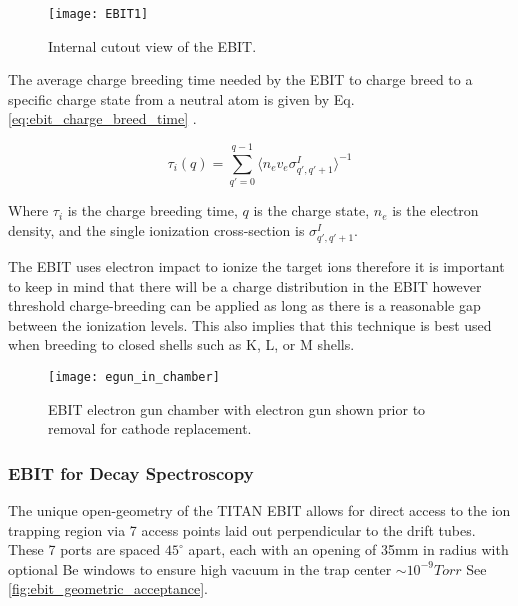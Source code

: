\documentclass[jon_ringuette_thesis_proposal.tex]{subfiles}
\begin{document}
    \begin{figure}[H]
        \begin{center}
            \texttt{[image: EBIT1]}
        \end{center}
        \caption{\small Internal cutout view of the EBIT. \cite{Leach}}
        \label{fig:ebit_schematic_1}
    \end{figure}


    The average charge breeding time needed by the EBIT to charge breed to a specific charge state from a neutral atom is given by Eq. \ref{eq:ebit_charge_breed_time} \cite{SPRINGER_1997}.

    \begin{equation}
        \tau_i(q) = \sum^{q-1}_{q'=0}\langle n_e v_e \sigma^I_{q', q'+1} \rangle^{-1}
        \label{eq:ebit_charge_breed_time}
    \end{equation}

    Where $\tau_i$ is the charge breeding time, $q$ is the charge state, $n_e$ is the electron density, and the single ionization cross-section is $\sigma^I_{q', q'+1}$.

    The EBIT uses electron impact to ionize the target ions therefore it is important to keep in mind that there will be a charge distribution in the EBIT however threshold charge-breeding can be applied as long as there is a reasonable gap between the ionization levels.
    This also implies that this technique is best used when breeding to closed shells such as K, L, or M shells.
    \begin{figure}[H]
        \begin{center}
            \texttt{[image: egun\_in\_chamber]}
        \end{center}
        \caption{EBIT electron gun chamber with electron gun shown prior to removal for cathode replacement.}
        \label{fig:egun_in_chamber}
    \end{figure}

    \subsubsection{EBIT for Decay Spectroscopy}

    The unique open-geometry of the TITAN EBIT \cite{TITAN2015} allows for direct access to the ion trapping region via 7 access points laid out perpendicular to the drift tubes.
    These 7 ports are spaced $45^{\circ}$ apart, each with an opening of 35mm in radius with optional Be windows to ensure high vacuum in the trap center $\sim 10^{-9} Torr$ See \ref{fig:ebit_geometric_acceptance}.
\end{document}

